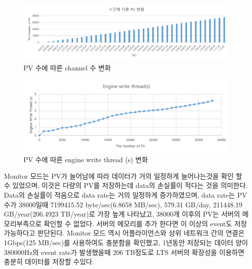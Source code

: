 \documentclass[11pt
  , a4paper
  , article
  , oneside
]{memoir}
\begin{document}
		\begin{figure}[h!]
			\centering
			\includegraphics[width=1\textwidth, height=0.3\textheight]{./images/pv1.png}
			\caption{PV 수에 따른 channel 수 변화}
		\end{figure}
\clearpage
\begin{figure}[h!]
	\centering
	\includegraphics[width=1\textwidth, height=0.3\textheight]{./images/thread1.png}
	\caption{PV 수에 따른 engine write thread (s) 변화}
\end{figure}

Monitor 모드는 PV가 늘어남에 따라 데이터가 거의 일정하게 늘어나는것을 확인 할 수 있었으며, 이것은 다량의 PV를 저장하는데 data의 손실률이 적다는 것을 의미한다. Data의 손실률이 적음으로 data rate는 거의 일정하게 증가하였으며, data rate는 PV수가 38000일때 7199415.52 byte/sec(6.8658 MB/sec), 579.31 GB/day, 211448.19 GB/year(206.4923 TB/year)로 가장 높게 나타났고, 38000개 이후의 PV는 서버의 메모리부족으로 확인할 수 없었다. 서버의 메모리를 추가 한다면 이 이상의 event도 저장 가능하다고 판단된다. Monitor 모드 역시 어플라이언스와 상위 네트워크 간의 연결은 1Gbps(125 MB/sec)를 사용하여도 충분함을 확인했고, 1년동안 저장되는 데이터 양이 380000Hz의 event rate가 발생했을때 206 TB정도로 LTS 서버의 확장성을 이용하면 충분히 데이터를 저장할 수있다.
\end{document}
